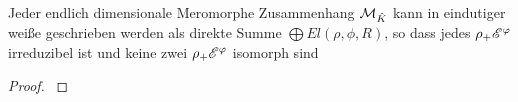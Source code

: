 \begin{thm}
  \cite[Cor 3.3]{sabbah_Fourier-local}
  Jeder endlich dimensionale Meromorphe Zusammenhang $\mathcal{M}_{\hat K}$ kann in
  eindutiger weiße geschrieben werden als direkte Summe $\bigoplus
  El(\rho,\phi,R)$, so dass jedes $\rho_+\mathscr{E}^\varphi$ irreduzibel ist und keine
  zwei $\rho_+\mathscr{E}^\varphi$ isomorph sind
\end{thm}
\begin{proof}
  \cite[Cor 3.3]{sabbah_Fourier-local}
\end{proof}

